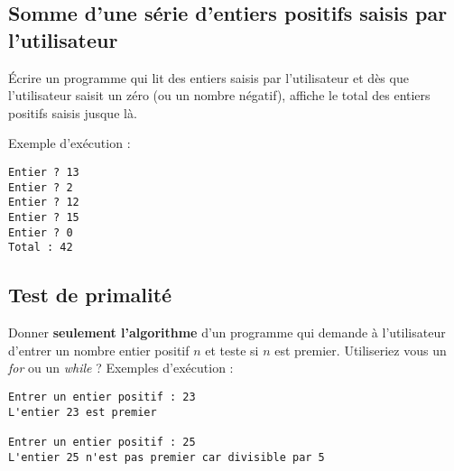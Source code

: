 \subsection{Somme d'une série d'entiers positifs saisis par
  l'utilisateur}
Écrire un programme qui lit des entiers saisis par
l'utilisateur et dès que l'utilisateur saisit un zéro (ou un nombre négatif), affiche le total des entiers positifs saisis jusque là.

Exemple d'exécution : 
\begin{verbatim}
Entier ? 13
Entier ? 2
Entier ? 12
Entier ? 15
Entier ? 0
Total : 42
\end{verbatim}

\subsection{Test de primalité}

Donner \textbf{seulement l'algorithme} d'un programme qui demande à l'utilisateur d'entrer un
nombre entier positif $n$ et teste si $n$ est premier. Utiliseriez
vous un \emph{for} ou un \emph{while} ? Exemples d'exécution :
\begin{small}
\begin{verbatim}
Entrer un entier positif : 23
L'entier 23 est premier

Entrer un entier positif : 25
L'entier 25 n'est pas premier car divisible par 5
\end{verbatim}
\end{small}

